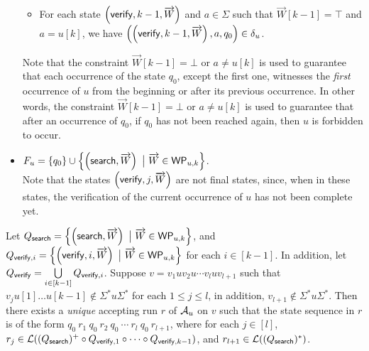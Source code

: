 \begin{definition}
\begin{itemize}
\begin{itemize}
		\item For each state $\left(\mathsf{verify}, k-1, \overrightarrow{W} \right)$ and $a \in \Sigma$ such that $\overrightarrow{W}[k-1]=\top$ and $a  = u[k]$, we have $\left(\left(\mathsf{verify}, k-1, \overrightarrow{W} \right), a, q_0\right) \in \delta_u$.
	\end{itemize}
Note that the constraint $\overrightarrow{W}[k-1] = \bot$ or $a \neq u[k]$ is used to guarantee that each occurrence of the state $q_0$, except the first one, witnesses the \emph{first} occurrence of $u$ from the beginning or after its previous occurrence. In other words, the constraint $\overrightarrow{W}[k-1] = \bot$ or $a \neq u[k]$ is used to guarantee that after an occurrence of $q_0$, if $q_0$ has not been reached again,  then $u$ is forbidden to occur.

	\item $F_u= \left\{q_0 \right\} \cup \left\{\left(\search, \overrightarrow{W} \right)\ \big\vert\ \overrightarrow{W} \in \wprof_{u, k} \right\} $. \\
	Note that the states $\left(\mathsf{verify}, j, \overrightarrow{W} \right)$ are not final states, since, when in these states, the verification of the current occurrence of $u$ has not been complete yet.
\end{itemize}
\end{definition}

Let $Q_{\mathsf{search}}  = \left\{ \left(\mathsf{search}, \overrightarrow{W} \right) \ \big\vert\ \overrightarrow{W} \in \mathsf{WP}_{u,k} \right\}$,  and $Q_{\mathsf{verify}, i} = \left\{ \left(\mathsf{verify}, i, \overrightarrow{W} \right) \ \big\vert\ \overrightarrow{W} \in \mathsf{WP}_{u,k} \right\}$ for each $i \in [k-1]$. In addition, let $Q_{\mathsf{verify}} = \bigcup \limits_{i \in [k-1]} Q_{\mathsf{verify},i}$.
Suppose $v = v_1 u v_2 u \cdots v_l u v_{l+1}$ such that $v_j u[1] \dots u[k-1] \not \in \Sigma^\ast u \Sigma^\ast$ for each $1 \le j \le l$, in addition, $v_{l+1} \not \in \Sigma^\ast u \Sigma^\ast$. Then there exists a \emph{unique} accepting run $r$ of $\mathcal{A}_u$ on $v$ such that the state sequence in $r$ is of the form
$q_0\ r_1\ q_0\ r_2\ q_0\ \cdots\ r_l\ q_0\ r_{l+1}$, where for each $j \in [l]$, $r_j \in  \mathcal{L}((Q_{\mathsf{search}})^+ \circ Q_{\mathsf{verify}, 1} \circ \cdots  \circ Q_{\mathsf{verify}, k-1})$, and $r_{l+1} \in \mathcal{L}((Q_{\mathsf{search}})^*)$. 

